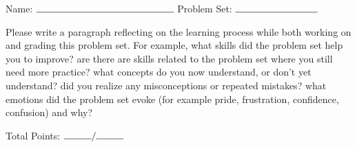 \documentclass[11pt]{article}
\begin{document}

\hfill Name: $\rule{5cm}{.15mm}$\newline
{}\hfill Problem Set: $\rule{3cm}{.15mm}$




\vspace{1cm}

Please write a paragraph reflecting on the learning process while both working on and grading this problem set. For example, what skills did the problem set help you to improve? are there are skills related to the problem set where you still need more practice? what concepts do you now understand, or don't yet understand? did you realize any misconceptions or repeated mistakes? what emotions did the problem set evoke (for example pride, frustration, confidence, confusion) and why?

\vspace{16cm}
\noindent Total Points: $\rule{1cm}{0.15mm}/\rule{1cm}{0.15mm}$
\end{document}
